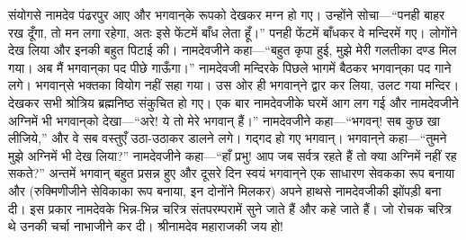 \begin{sloppypar}\justifying{}
संयोगसे नामदेव पंढरपुर आए और भगवान्‌के रूपको देखकर मग्न हो गए। उन्होंने सोचा—“पनही बाहर रख दूँगा, तो मन लगा रहेगा, अतः इसे फेंटमें बाँध लेता हूँ।” पनही फेंटमें बाँधकर वे मन्दिरमें गए। लोगोंने देख लिया और इनकी बहुत पिटाई की। नामदेवजीने कहा—“बहुत कृपा हुई, मुझे मेरी गलतीका दण्ड मिल गया। अब मैं भगवान्‌का पद पीछे गाऊँगा।” नामदेवजी मन्दिरके पिछले भागमें बैठकर भगवान्‌का पद गाने लगे। भगवान्‌से भक्तका वियोग नहीं सहा गया। उस ओर ही भगवान्‌ने द्वार कर लिया, उलट गया मन्दिर। देखकर सभी श्रोत्रिय ब्रह्मनिष्ठ संकुचित हो गए। एक बार नामदेवजीके घरमें आग लग गई और नामदेवजीने अग्निमें भी भगवान्‌को देखा—“अरे! ये तो मेरे भगवान् हैं।” नामदेवजीने कहा—“भगवन्! सब कुछ खा लीजिये,” और वे सब वस्तुएँ उठा-उठाकर डालने लगे। गद्गद हो गए भगवान्। भगवान्‌ने कहा—“तुमने मुझे अग्निमें भी देख लिया?” नामदेवजीने कहा—“हाँ प्रभु! आप जब सर्वत्र रहते हैं तो क्या अग्निमें नहीं रह सकते?” अन्तमें भगवान् बहुत प्रसन्न हुए और दूसरे दिन स्वयं भगवान्‌ने एक साधारण सेवकका रूप बनाया और (रुक्मिणीजीने सेविकाका रूप बनाया, इन दोनोंने मिलकर) अपने हाथसे नामदेवजीकी झोंपड़ी बना दी। इस प्रकार नामदेवके भिन्न-भिन्न चरित्र संत\-परम्परामें सुने जाते हैं और कहे जाते हैं। जो रोचक चरित्र थे उनकी चर्चा नाभाजीने कर दी। श्रीनामदेव महाराजकी जय हो!
\end{sloppypar}


